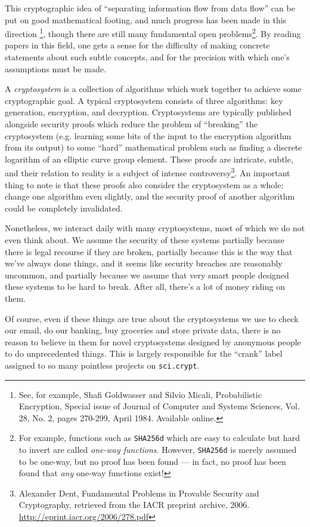 \documentclass[letterpaper]{article}
\begin{document}
This cryptographic idea of ``separating information flow from data flow''
can be put on good mathematical footing, and much progress has been made
in this direction \footnote{See, for example, Shafi Goldwasser and Silvio
Micali, Probabilistic Encryption, Special issue of Journal of Computer and
Systems Sciences, Vol. 28, No. 2, pages 270-299, April 1984. Available online.},
though there are still many fundamental open problems\footnote{For example,
functions such as \texttt{SHA256d} which are easy to calculate but hard to
invert are called \emph{one-way functions}. However, \texttt{SHA256d} is
merely assumed to be one-way, but no proof has been found --- in fact, no
proof has been found that \emph{any} one-way functions exist!}. By reading
papers in this field, one gets a sense for the difficulty of making
concrete statements about such subtle concepts, and for the precision
with which one's assumptions must be made.

A \emph{cryptosystem} is a collection of algorithms which work together
to achieve some cryptographic goal. A typical cryptosystem consists of
three algorithms: key generation, encryption, and decryption. Cryptosystems
are typically published alongside security proofs which reduce the problem
of ``breaking'' the cryptosystem (e.g. learning some bits of the input to
the encryption algorithm from its output) to some ``hard'' mathematical
problem such as finding a discrete logarithm of an elliptic curve group
element. These proofs are intricate, subtle, and their relation to reality
is a subject of intense controversy\footnote{Alexander Dent, Fundamental
Problems in Provable Security and Cryptography, retrieved from the IACR
preprint archive, 2006. \url{http://eprint.iacr.org/2006/278.pdf}}. An
important thing to note is that these proofs also consider the cryptosystem
as a whole: change one algorithm even slightly, and the security proof of
another algorithm could be completely invalidated.

Nonetheless, we interact daily with many cryptosystems, most of which we
do not even think about. We assume the security of these systems partially
because there is legal recourse if they are broken, partially because this
is the way that we've always done things, and it seems like security breaches
are reasonably uncommon, and partially because we assume that very smart people
designed these systems to be hard to break. After all, there's a lot of money
riding on them.

Of course, even if these things are true about the cryptosystems we use to
check our email, do our banking, buy groceries and store private data, there
is no reason to believe in them for novel cryptosystems designed by anonymous
people to do unprecedented things. This is largely responsible for the ``crank''
label assigned to so many pointless projects on \texttt{sci.crypt}.
\end{document}
